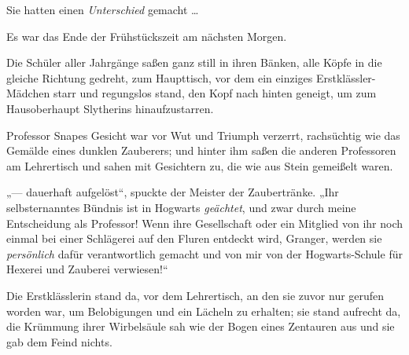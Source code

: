 Sie hatten einen \emph{Unterschied} gemacht …

\later

Es war das Ende der Frühstückszeit am nächsten Morgen.

Die Schüler aller Jahrgänge saßen ganz still in ihren Bänken, alle Köpfe in die gleiche Richtung gedreht, zum Haupttisch, vor dem ein einziges Erstklässler-Mädchen starr und regungslos stand, den Kopf nach hinten geneigt, um zum Hausoberhaupt Slytherins hinaufzustarren.

Professor Snapes Gesicht war vor Wut und Triumph verzerrt, rachsüchtig wie das Gemälde eines dunklen Zauberers; und hinter ihm saßen die anderen Professoren am Lehrertisch und sahen mit Gesichtern zu, die wie aus Stein gemeißelt waren.

„— dauerhaft aufgelöst“, spuckte der Meister der Zaubertränke.
„Ihr selbsternanntes Bündnis ist in Hogwarts \emph{geächtet}, und zwar durch meine Entscheidung als Professor! Wenn ihre Gesellschaft oder ein Mitglied von ihr noch einmal bei einer Schlägerei auf den Fluren entdeckt wird, Granger, werden sie \emph{persönlich} dafür verantwortlich gemacht und von mir von der Hogwarts-Schule für Hexerei und Zauberei verwiesen!“

Die Erstklässlerin stand da, vor dem Lehrertisch, an den sie zuvor nur gerufen worden war, um Belobigungen und ein Lächeln zu erhalten; sie stand aufrecht da, die Krümmung ihrer Wirbelsäule sah wie der Bogen eines Zentauren aus und sie gab dem Feind nichts.


